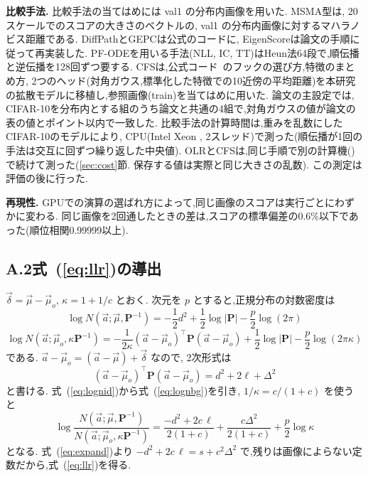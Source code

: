 \documentclass[MIRU,submit]{miru2025j}
\newcommand{\Ours}{OLR}   %
\newcommand{\Pm}{\mathbf{P}}\newcommand{\Gm}{\mathbf{G}}\newcommand{\vd}{\vec{\delta}}\newcommand{\vmu}{\vec{\mu}}\newcommand{\va}{\vec{a}}\newcommand{\Sm}{\mathbf{S}}\newcommand{\Id}{\mathbf{I}}
\renewcommand{\eqref}[1]{(\ref{#1})}   %
\begin{document}
\textbf{比較手法.}
比較手法の当てはめには val1 の分布内画像を用いた. MSMA型は, 20スケールでのスコアの大きさのベクトルの, val1 の分布内画像に対するマハラノビス距離である. DiffPathとGEPCは公式のコードに, EigenScoreは論文の手順に従って再実装した. PF-ODEを用いる手法(NLL, IC, TT)はHeun法64段で,順伝播と逆伝播を128回ずつ要する. CFSは,公式コード~\cite{rouzoumka2026cfs}のフックの選び方,特徴のまとめ方, 2つのヘッド(対角ガウス,標準化した特徴での10近傍の平均距離)を本研究の拡散モデルに移植し,参照画像(train)を当てはめに用いた. 論文の主設定では, CIFAR-10を分布内とする組のうち論文と共通の4組で,対角ガウスの値が論文の表の値と\cfsRepMaxDiff{}ポイント以内で一致した. 比較手法の計算時間は,重みを乱数にしたCIFAR-10のモデルにより, CPU(Intel Xeon \cpuGHz, 2スレッド)で測った(順伝播が1回の手法は交互に\cpuReps{}回ずつ繰り返した中央値). \Ours{}とCFSは,同じ手順で別の計算機(\olCpuHere)で続けて測った(\ref{sec:cost}節. 保存する値は実際と同じ大きさの乱数). この測定は評価の後に行った.

\textbf{再現性.}
GPUでの演算の選ばれ方によって,同じ画像のスコアは実行ごとにわずかに変わる. 同じ画像を2回通したときの差は,スコアの標準偏差の0.6\%以下であった(順位相関0.99999以上).

\subsection*{A.2\quad 式~\eqref{eq:llr}の導出}
$\vd=\vmu-\vmu_{o}$, $\kappa=1+1/c$ とおく. 次元を $p$ とすると,正規分布の対数密度は
\begin{equation}
\log N(\va;\vmu,\Pm^{-1})=-\frac{1}{2}d^{2}+\frac{1}{2}\log|\Pm|-\frac{p}{2}\log(2\pi)
\label{eq:lognid}
\end{equation}
\begin{equation}
\log N(\va;\vmu_{o},\kappa\Pm^{-1})=-\frac{1}{2\kappa}(\va-\vmu_{o})^{\top}\Pm(\va-\vmu_{o})+\frac{1}{2}\log|\Pm|-\frac{p}{2}\log(2\pi\kappa)
\label{eq:lognbg}
\end{equation}
である. $\va-\vmu_{o}=(\va-\vmu)+\vd$ なので, 2次形式は
\begin{equation}
(\va-\vmu_{o})^{\top}\Pm(\va-\vmu_{o})=d^{2}+2\ell+\Delta^{2}
\label{eq:quadbg}
\end{equation}
と書ける. 式~\eqref{eq:lognid}から式~\eqref{eq:lognbg}を引き, $1/\kappa=c/(1+c)$ を使うと
\begin{equation}
\log\frac{N(\va;\vmu,\Pm^{-1})}{N(\va;\vmu_{o},\kappa\Pm^{-1})}=\frac{-d^{2}+2c\,\ell}{2(1+c)}+\frac{c\Delta^{2}}{2(1+c)}+\frac{p}{2}\log\kappa
\label{eq:llrfull}
\end{equation}
となる. 式~\eqref{eq:expand}より $-d^{2}+2c\,\ell=s+c^{2}\Delta^{2}$ で,残りは画像によらない定数だから,式~\eqref{eq:llr}を得る.
\end{document}
